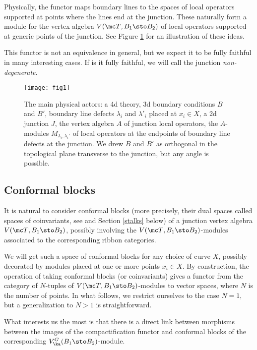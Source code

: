 \documentclass[11pt,reqno]{amsart}
\theoremstyle{plain}
\numberwithin{equation}{section}
\theoremstyle{definition}
\begin{document}
Physically, the functor maps boundary lines to the spaces of local
operators supported at points where the lines end at the junction.
These naturally form a module for the vertex algebra $V({\mc
  T},B_1\sto B_2)$ of local operators supported at generic points of
the junction.  See Figure \ref{fig1} for an illustration of these
ideas.

This functor is not an equivalence in general, but we expect it to be
fully faithful in many interesting cases. If is it fully faithful, we
will call the junction {\em non-degenerate}.

\begin{figure}
\center
\texttt{[image: fig1]}
\caption{The main physical actors: a 4d theory, 3d boundary conditions
  $B$ and $B'$, boundary line defects
$\lambda_i$ and $\lambda'_i$ placed at $x_i \in X$, a 2d junction $J$,
the vertex algebra $A$ of junction local operators,
the $A$-modules $M_{\lambda_i, \lambda_i'}$ of local operators at the
endpoints of boundary line defects at the junction. We drew $B$ and
$B'$ as
orthogonal in the topological plane transverse to the junction, but
any angle is possible.} \label{fig1}
\end{figure}

\subsection{Conformal blocks}    \label{cb}

It is natural to consider conformal blocks (more precisely, their dual
spaces called spaces of coinvariants, see \cite{FB,BD1} and Section
\ref{stalks} below) of a junction vertex algebra $V({\mc T},B_1\sto
B_2)$, possibly involving the $V({\mc T},B_1\sto B_2)$-modules
associated to the corresponding ribbon categories.

We will get such a space of conformal blocks for any choice of curve
$X$, possibly decorated by modules placed at one or more points $x_i
\in X$. By construction, the operation of taking conformal blocks (or
coinvariants) gives a functor from the category of $N$-tuples of
$V({\mc T},B_1\sto B_2)$-modules to vector spaces, where $N$ is the
number of points. In what follows, we restrict ourselves to the case
$N=1$, but a generalization to $N>1$ is straightforward.

What interests us the most is that there is a direct link between
morphisms between the images of the compactification functor and
conformal blocks of the corresponding $V^G_\ka(B_1\sto B_2)$-module.
\end{document}
